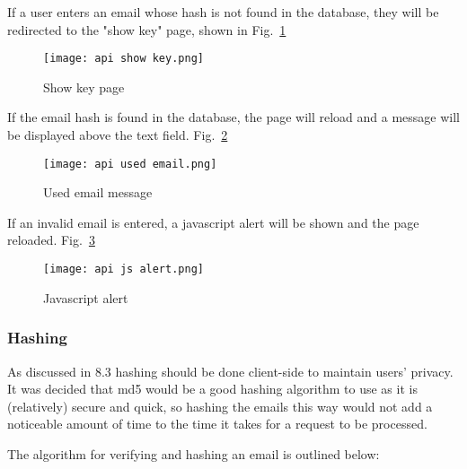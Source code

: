            If a user enters an email whose hash is not found in the database, they will be redirected to the "show key" page, shown in Fig.~\ref{fig:api_show_key}

            \begin{figure}[htbp]
                \centering
                \texttt{[image: api show key.png]}
                \caption{Show key page}
                \label{fig:api_show_key}
            \end{figure}

            If the email hash is found in the database, the page will reload and a message will be displayed above the text field. Fig.~\ref{fig:api_used_email}

            \begin{figure}[htbp]
                \centering
                \texttt{[image: api used email.png]}
                \caption{Used email message}
                \label{fig:api_used_email}
            \end{figure}

            If an invalid email is entered, a javascript alert will be shown and the page reloaded. Fig.~\ref{fig:api_js_alert}
            
            \begin{figure}[htbp]
                \centering
                \texttt{[image: api js alert.png]}
                \caption{Javascript alert}
                \label{fig:api_js_alert}
            \end{figure}
            
            \pagebreak
            \subsubsection{Hashing}
            As discussed in 8.3 hashing should be done client-side to maintain users' privacy. It was decided that md5 would be a good hashing algorithm to use as it is (relatively) secure and quick, so hashing the emails this way would not add a noticeable amount of time to the time it takes for a request to be processed.

            \vspace{3mm}\linebreak
            The algorithm for verifying and hashing an email is outlined below:

